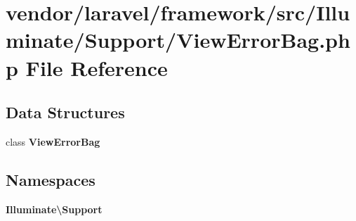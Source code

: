 \section{vendor/laravel/framework/src/\+Illuminate/\+Support/\+View\+Error\+Bag.php File Reference}
\label{_view_error_bag_8php}
\subsection*{Data Structures}
\begin{DoxyCompactItemize}
\item 
class {\bf View\+Error\+Bag}
\end{DoxyCompactItemize}
\subsection*{Namespaces}
\begin{DoxyCompactItemize}
\item 
 {\bf Illuminate\textbackslash{}\+Support}
\end{DoxyCompactItemize}
